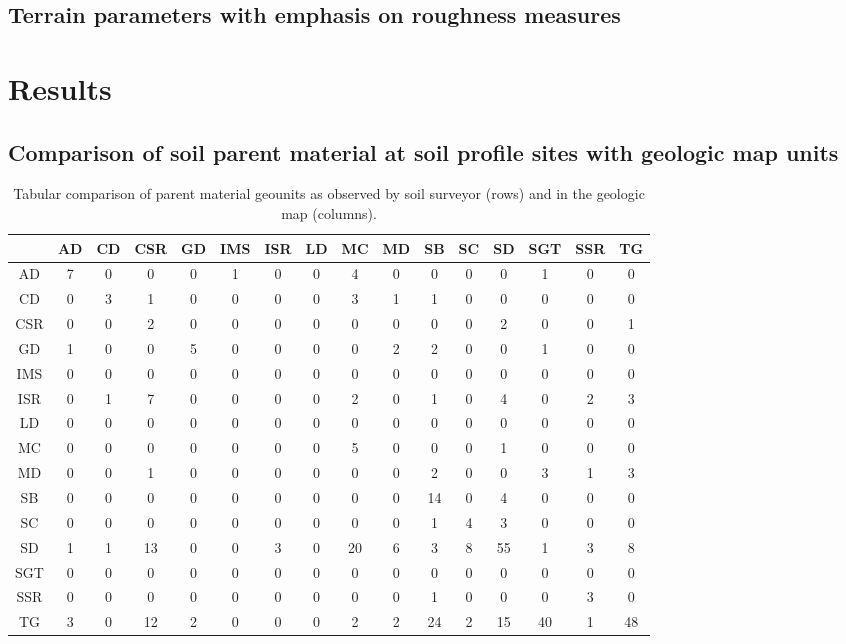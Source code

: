 \documentclass[preprint,12pt,authoryear]{elsarticle}
\begin{document}
\subsection{Terrain parameters with emphasis on roughness measures}
\citep{Riley1999}
\section{Results}
\subsection{Comparison of soil parent material at soil profile sites with geologic map units}
\begin{table}[ht]
\centering
\tabcolsep=0.10cm
\begin{tabular}{cccccccccccccccc}
  \hline
 & AD & CD & CSR & GD & IMS & ISR & LD & MC & MD & SB & SC & SD & SGT & SSR & TG \\ 
  \hline
AD &   7 &   0 &   0 &   0 &   1 &   0 &   0 &   4 &   0 &   0 &   0 &   0 &   1 &   0 &   0 \\ 
  CD &   0 &   3 &   1 &   0 &   0 &   0 &   0 &   3 &   1 &   1 &   0 &   0 &   0 &   0 &   0 \\ 
  CSR &   0 &   0 &   2 &   0 &   0 &   0 &   0 &   0 &   0 &   0 &   0 &   2 &   0 &   0 &   1 \\ 
  GD &   1 &   0 &   0 &   5 &   0 &   0 &   0 &   0 &   2 &   2 &   0 &   0 &   1 &   0 &   0 \\ 
  IMS &   0 &   0 &   0 &   0 &   0 &   0 &   0 &   0 &   0 &   0 &   0 &   0 &   0 &   0 &   0 \\ 
  ISR &   0 &   1 &   7 &   0 &   0 &   0 &   0 &   2 &   0 &   1 &   0 &   4 &   0 &   2 &   3 \\ 
  LD &   0 &   0 &   0 &   0 &   0 &   0 &   0 &   0 &   0 &   0 &   0 &   0 &   0 &   0 &   0 \\ 
  MC &   0 &   0 &   0 &   0 &   0 &   0 &   0 &   5 &   0 &   0 &   0 &   1 &   0 &   0 &   0 \\ 
  MD &   0 &   0 &   1 &   0 &   0 &   0 &   0 &   0 &   0 &   2 &   0 &   0 &   3 &   1 &   3 \\ 
  SB &   0 &   0 &   0 &   0 &   0 &   0 &   0 &   0 &   0 &  14 &   0 &   4 &   0 &   0 &   0 \\ 
  SC &   0 &   0 &   0 &   0 &   0 &   0 &   0 &   0 &   0 &   1 &   4 &   3 &   0 &   0 &   0 \\ 
  SD &   1 &   1 &  13 &   0 &   0 &   3 &   0 &  20 &   6 &   3 &   8 &  55 &   1 &   3 &   8 \\ 
  SGT &   0 &   0 &   0 &   0 &   0 &   0 &   0 &   0 &   0 &   0 &   0 &   0 &   0 &   0 &   0 \\ 
  SSR &   0 &   0 &   0 &   0 &   0 &   0 &   0 &   0 &   0 &   1 &   0 &   0 &   0 &   3 &   0 \\ 
  TG &   3 &   0 &  12 &   2 &   0 &   0 &   0 &   2 &   2 &  24 &   2 &  15 &  40 &   1 &  48 \\ 
   \hline
\end{tabular}
\caption{Tabular comparison of parent material geounits as observed by soil surveyor (rows) and in the geologic map (columns).} 
\label{kartiergegenkarte}
\end{table}
\end{document}
